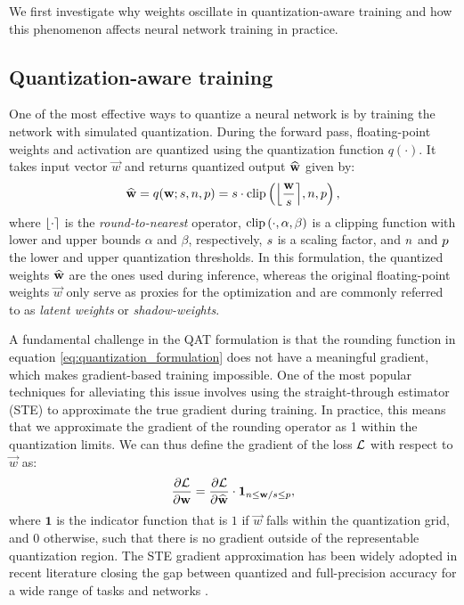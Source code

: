We first investigate why weights oscillate in quantization-aware training and how this phenomenon affects neural network training in practice.

\subsection{Quantization-aware training}
\label{sec:qat}
One of the most effective ways to quantize a neural network is by training the network with simulated quantization. During the forward pass, floating-point weights and activation are quantized using the quantization function $q(\cdot)$. It takes input vector $\vec{w}$ and returns quantized output $\vecq{w}$ given by:
\begin{equation}
    \label{eq:quantization_formulation}
    \vecq{w} = q(\vec{w}; s, n, p) = \ct{s} \cdot \clip{\round*{\frac{\vec{w}}{\ct{s}}}}{\ct{n}}{\ct{p}}, 
\end{equation}
where $\round*{\cdot}$ is the \textit{round-to-nearest} operator, $\clip{\cdot}{\alpha}{\beta}$ is a clipping function with lower and upper bounds $\alpha$ and $\beta$, respectively, $\ct{s}$ is a scaling factor, and $\ct{n}$ and $\ct{p}$ the lower and upper quantization thresholds.
In this formulation, the quantized weights $\vecq{w}$ are the ones used during inference, whereas the original floating-point weights $\vec{w}$ only serve as proxies for the optimization and are commonly referred to as \textit{latent weights} or \textit{shadow-weights}.

A fundamental challenge in the QAT formulation is that the rounding function in equation \eqref{eq:quantization_formulation} does not have a meaningful gradient, which makes gradient-based training impossible. One of the most popular techniques for alleviating this issue involves using the straight-through estimator (STE) \cite{bengio2013estimating, hinton2012ste} to approximate the true gradient during training. In practice, this means that we approximate the gradient of the rounding operator as 1 within the quantization limits. We can thus define the gradient of the loss $\tlossb$ with respect to $\vec{w}$ as:
\begin{equation}
    \label{eq:dl_dw_ste}
    \frac{\partial\vec{\tlossb}}{\partial \vec{w}} = \frac{\partial\vec{\tlossb}}{\partial \vecq{w}} \cdot \mathbf{1}_{n \leq \vec{w}/\ct{s} \leq p},
\end{equation}
where $\mathbf{1}$ is the indicator function that is $1$ if $\vec{w}$ falls within the quantization grid, and 0 otherwise, such that there is no gradient outside of the representable quantization region. The STE gradient approximation has been widely adopted in recent literature closing the gap between quantized and full-precision accuracy for a wide range of tasks and networks \citep{Gupta2015, dorefa, krishnamoorthi, tqt, lsq, lsq+, whitepaper}.


